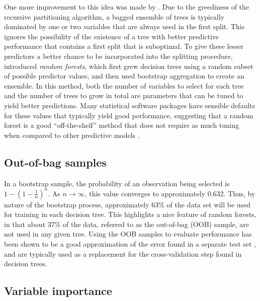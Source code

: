 	One more improvement to this idea was made by . Due to the greediness of the recursive partitioning algorithm, a bagged ensemble of trees is typically dominated by one or two variables that are always used in the first split. This ignores the possibility of the existence of a tree with better predictive performance that contains a first split that is suboptimal. To give these lesser predictors a better chance to be incorporated into the splitting procedure,  introduced \textit{random forests}, which first grew decision trees using a random subset of possible predictor values, and then used bootstrap aggregation to create an ensemble. In this method, both the number of variables to select for each tree and the number of trees to grow in total are parameters that can be tuned to yield better predictions. Many statistical software packages have sensible defaults for these values that typically yield good performance, suggesting that a random forest is a good ``off-the-shelf'' method that does not require as much tuning when compared to other predictive models \cite{strobl2009introduction}.



\subsection{Out-of-bag samples}


	In a bootstrap sample, the probability of an observation being selected is $1 - (1 - \frac{1}{n})^n$. As $n \rightarrow \infty$, this value converges to approximately 0.632. Thus, by nature of the bootstrap process, approximately 63\% of the data set will be used for training in each decision tree. This highlights a nice feature of random forests, in that about 37\% of the data, referred to as the out-of-bag (OOB) sample, are not used in any given tree. Using the OOB samples to evaluate performance has been shown to be a good approximation of the error found in a separate test set \cite{hastie2009elements}, and are typically used as a replacement for the cross-validation step found in decision trees.



\subsection{Variable importance}


